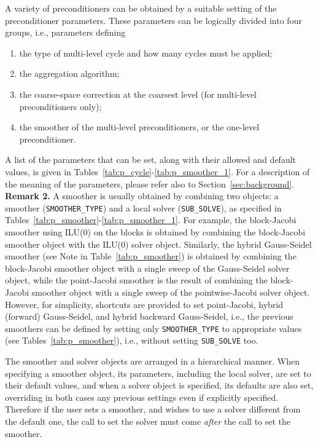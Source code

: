 A variety of preconditioners can be obtained
by a suitable setting of the preconditioner parameters. These parameters
can be logically divided into four groups, i.e., parameters defining
\begin{enumerate}
	\item the type of multi-level cycle and how many cycles must be applied;
        \item the aggregation algorithm;
        \item the coarse-space correction at the coarsest level (for multi-level
                 preconditioners only);
	\item the smoother of the multi-level preconditioners, or the one-level
                  preconditioner.
	
\end{enumerate}
A list of the parameters that can be set, along with their allowed and
default values, is given in Tables~\ref{tab:p_cycle}-\ref{tab:p_smoother_1}.
For a description of the meaning of the parameters, please
refer also to Section~\ref{sec:background}. \\

\textbf{Remark 2.} A smoother is usually obtained by combining two objects:
a smoother (\verb|SMOOTHER_TYPE|) and a local solver (\verb|SUB_SOLVE|),
as specified in Tables~\ref{tab:p_smoother}-\ref{tab:p_smoother_1}.
For example, the block-Jacobi smoother using
ILU(0) on the blocks is obtained by combining the block-Jacobi smoother
object with the ILU(0) solver object. Similarly,
the hybrid Gauss-Seidel smoother (see Note in Table~\ref{tab:p_smoother})
is obtained by combining the block-Jacobi smoother object with a single sweep
of the Gauss-Seidel solver object, while the point-Jacobi smoother is the
result of combining the block-Jacobi smoother object with a single sweep
of the pointwise-Jacobi solver object. However, for simplicity, shortcuts are
provided to set point-Jacobi, hybrid (forward) Gauss-Seidel, and
hybrid backward Gauss-Seidel, i.e., the previous smoothers can be defined
by setting only \verb|SMOOTHER_TYPE| to appropriate values (see
Tables~\ref{tab:p_smoother}), i.e., without setting
\verb|SUB_SOLVE| too.

The smoother and solver objects are arranged in a
hierarchical manner. When specifying a smoother object, its parameters,
including the local solver, are set to their default values, and when a solver
object is specified, its defaults are also set, overriding in both
cases any previous settings even if explicitly specified. Therefore if
the user sets a smoother, and wishes to use a solver
different from  the default one, the call to set the solver must come
\emph{after} the call to set the smoother. 

